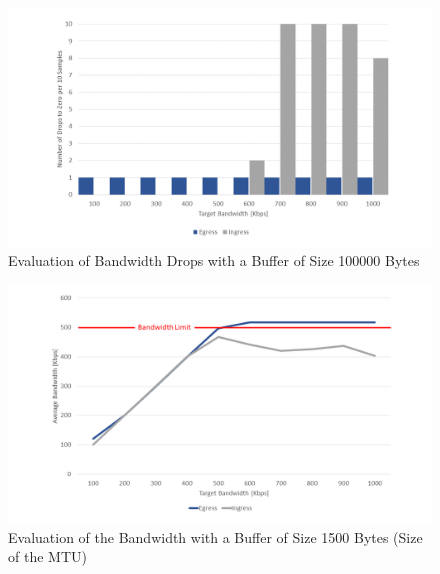 \begin{figure}[h]
	\centering
	\includegraphics[width=\textwidth]{img/Evaluation-Zeros-Big-Buffer.png}
	\caption{Evaluation of Bandwidth Drops with a Buffer of Size 100000 Bytes}
	\label{Evaluation of Bandwidth Drops with a Buffer of Size 100000 Bytes}
\end{figure}

\begin{figure}[h]
	\centering
	\includegraphics[width=\textwidth]{img/Evaluation-Bandwidth-Small-Buffer.png}
	\caption{Evaluation of the Bandwidth with a Buffer of Size 1500 Bytes (Size of the MTU)}
	\label{Evaluation of the Bandwidth with a Buffer of Size 1500 Bytes (Size of the MTU)}
\end{figure}